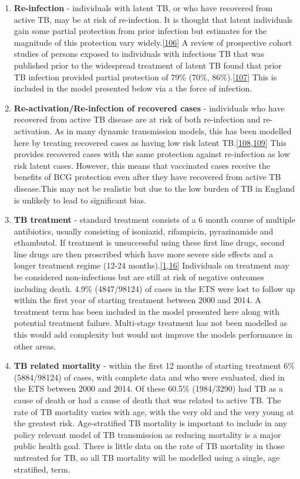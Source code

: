 \documentclass[11pt,twoside]{bristolthesis}
\begin{document}
\begin{enumerate}
  \item
    \textbf{Re-infection} - individuals with latent TB, or who have recovered from active TB, may be at risk of re-infection. It is thought that latent individuals gain some partial protection from prior infection but estimates for the magnitude of this protection vary widely.{[}\protect\hyperlink{ref-Houben2016}{106}{]} A review of prospective cohort studies of persons exposed to individuals with infectious TB that was published prior to the widespread treatment of latent TB found that prior TB infection provided partial protection of 79\% (70\%, 86\%).{[}\protect\hyperlink{ref-Andrews2012}{107}{]} This is included in the model presented below via a the force of infection.
  \item
    \textbf{Re-activation/Re-infection of recovered cases} - individuals who have recovered from active TB disease are at risk of both re-infection and re-activation. As in many dynamic transmission models, this has been modelled here by treating recovered cases as having low risk latent TB.{[}\protect\hyperlink{ref-Vynnycky1997}{108},\protect\hyperlink{ref-Houben2016a}{109}{]} This provides recovered cases with the same protection against re-infection as low risk latent cases. However, this means that vaccinated cases receive the benefits of BCG protection even after they have recovered from active TB disease.This may not be realistic but due to the low burden of TB in England is unlikely to lead to significant bias.
  \item
    \textbf{TB treatment} - standard treatment consists of a 6 month course of multiple antibiotics, usually consisting of isoniazid, rifampicin, pyrazinamide and ethambutol. If treatment is unsuccessful using these first line drugs, second line drugs are then proscribed which have more severe side effects and a longer treatment regime (12-24 months).{[}\protect\hyperlink{ref-PHE2017}{1},\protect\hyperlink{ref-WHOTB2016}{16}{]} Individuals on treatment may be considered non-infectious but are still at risk of negative outcomes including death. 4.9\% (4847/98124) of cases in the ETS were lost to follow up within the first year of starting treatment between 2000 and 2014. A treatment term has been included in the model presented here along with potential treatment failure. Multi-stage treatment has not been modelled as this would add complexity but would not improve the models performance in other areas.
  \item
    \textbf{TB related mortality} - within the first 12 months of starting treatment 6\% (5884/98124) of cases, with complete data and who were evaluated, died in the ETS between 2000 and 2014. Of these 60.5\% (1984/3290) had TB as a cause of death or had a cause of death that was related to active TB. The rate of TB mortality varies with age, with the very old and the very young at the greatest risk. Age-stratified TB mortality is important to include in any policy relevant model of TB transmission as reducing mortality is a major public health goal. There is little data on the rate of TB mortality in those untreated for TB, so all TB mortality will be modelled using a single, age stratified, term.

\end{enumerate}
\end{document}
